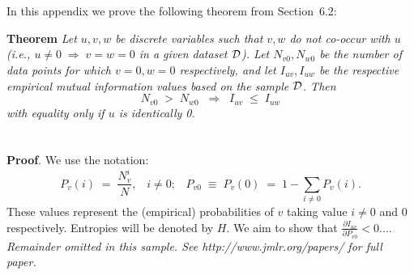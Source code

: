 \documentclass[twoside,11pt]{article}
\newcommand{\dataset}{{\cal D}}
\newcommand{\fracpartial}[2]{\frac{\partial #1}{\partial  #2}}
\begin{document}



\newpage

\appendix
\section{}
\label{app:theorem}



In this appendix we prove the following theorem from
Section~6.2:

\noindent
{\bf Theorem} {\it Let $u,v,w$ be discrete variables such that $v, w$ do
not co-occur with $u$ (i.e., $u\neq0\;\Rightarrow \;v=w=0$ in a given
dataset $\dataset$). Let $N_{v0},N_{w0}$ be the number of data points for
which $v=0, w=0$ respectively, and let $I_{uv},I_{uw}$ be the
respective empirical mutual information values based on the sample
$\dataset$. Then
\[
	N_{v0} \;>\; N_{w0}\;\;\Rightarrow\;\;I_{uv} \;\leq\;I_{uw}
\]
with equality only if $u$ is identically 0.} \hfill\BlackBox

\section{}

\noindent
{\bf Proof}. We use the notation:
\[
P_v(i) \;=\;\frac{N_v^i}{N},\;\;\;i \neq 0;\;\;\;
P_{v0}\;\equiv\;P_v(0)\; = \;1 - \sum_{i\neq 0}P_v(i).
\]
These values represent the (empirical) probabilities of $v$
taking value $i\neq 0$ and 0 respectively.  Entropies will be denoted
by $H$. We aim to show that $\fracpartial{I_{uv}}{P_{v0}} < 0$....\\

{\noindent \em Remainder omitted in this sample. See http://www.jmlr.org/papers/ for full paper.}


\vskip 0.2in

\end{document}
